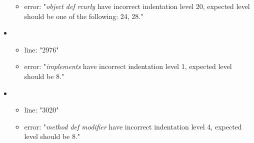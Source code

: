 \begin{itemize}
\begin{itemize}
		\item error: "\emph{object def rcurly} have incorrect indentation level 20, expected level should be one of the following: 24, 28." 
	\end{itemize}
	\item 
	\begin{itemize} 
		\item line: "2976" 
		\item error: "\emph{implements} have incorrect indentation level 1, expected level should be 8." 
	\end{itemize}
	\item 
	\begin{itemize} 
		\item line: "3020" 
		\item error: "\emph{method def modifier} have incorrect indentation level 4, expected level should be 8." 
	\end{itemize}

\end{itemize}
